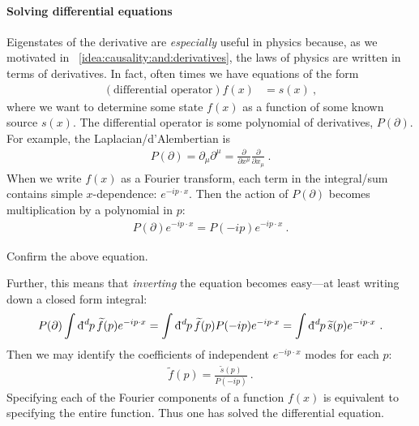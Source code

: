 \documentclass[12pt, oneside]{report}    %
\begin{document}
\paragraph{Solving differential equations}
Eigenstates of the derivative are \emph{especially} useful in physics because, as we motivated in \bigidearef{}~\ref{idea:causality:and:derivatives}, the laws of physics are written in terms of derivatives. In fact, often times we have equations of the form 
\begin{align}
    (\text{differential operator}) f(x) &= s(x) \ ,
\end{align}
where we want to determine some state $f(x)$ as a function of some known source $s(x)$. The differential operator is some polynomial of derivatives, $P(\partial)$. For example, the Laplacian/d'Alembertian is
\begin{align}
    P(\partial) = \partial_\mu \partial^\mu = \frac{\partial}{\partial x^\mu}\frac{\partial}{\partial x_\mu} \ .
\end{align}
When we write $f(x)$ as a Fourier transform, each term in the integral/sum contains simple $x$-dependence: $e^{-ip\cdot x}$. Then the action of $P(\partial)$ becomes multiplication by a polynomial in $p$:
\begin{align}
    P(\partial) e^{-ip\cdot x}
    = 
    P(-ip) e^{-ip\cdot x} \ .
\end{align}
\begin{exercise}
Confirm the above equation. 
\end{exercise}
Further, this means that \emph{inverting} the equation becomes easy---at least writing down a closed form integral:
\begin{align}
    P(\partial) 
    \int \DDbar{d}{p}\, \tilde f(p)
    e^{-ip\cdot x}
    =
    \int \DDbar{d}{p}\, \tilde f(p) P(-ip) 
    e^{-ip\cdot x}
    = 
    \int \DDbar{d}{p}\, \tilde s(p)
    e^{-ip\cdot x} \ .
\end{align}
Then we may identify the coefficients of independent $e^{-ip\cdot x}$ modes for each $p$:
\begin{align}
    \tilde f(p) = \frac{\tilde s(p)}{P(-ip)} \ .
\end{align}
Specifying each of the Fourier components of a function $f(x)$ is equivalent to specifying the entire function. Thus one has solved the differential equation.
\end{document}
